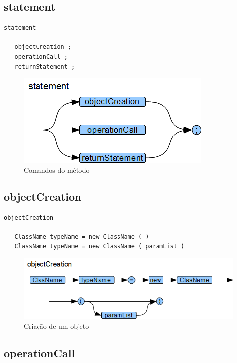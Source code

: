 \subsection{statement}

\begin{lstlisting}
statement

   objectCreation ;
   operationCall ;
   returnStatement ;

\end{lstlisting}

\begin{figure}[h!]
 \centering
 \includegraphics{capitulo09/statement.png}
 \caption{Comandos do método}
\end{figure}
\subsection{objectCreation}

\begin{lstlisting}
objectCreation

   ClassName typeName = new ClassName ( )
   ClassName typeName = new ClassName ( paramList )

\end{lstlisting}

\begin{figure}[h!]
 \centering
 \includegraphics{capitulo09/objectCreation.png}
 \caption{Criação de um objeto}
\end{figure}
\newpage
\subsection{operationCall}

